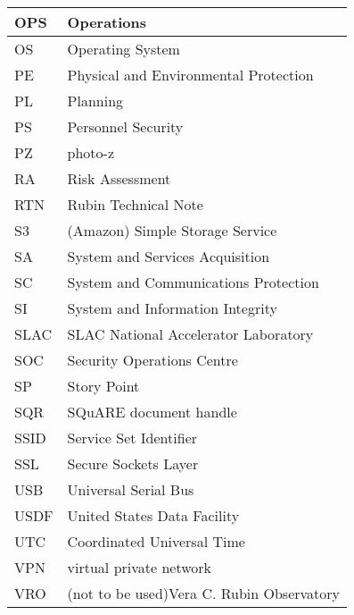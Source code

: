 \begin{longtable}{p{}p{}}
OPS & Operations \\\hline
OS & Operating System \\\hline
PE & Physical and Environmental Protection \\\hline
PL & Planning \\\hline
PS & Personnel Security \\\hline
PZ & photo-z \\\hline
RA & Risk Assessment \\\hline
RTN & Rubin Technical Note \\\hline
S3 & (Amazon) Simple Storage Service \\\hline
SA & System and Services Acquisition \\\hline
SC & System and Communications Protection \\\hline
SI & System and Information Integrity \\\hline
SLAC & SLAC National Accelerator Laboratory \\\hline
SOC & Security Operations Centre \\\hline
SP & Story Point \\\hline
SQR & SQuARE document handle \\\hline
SSID & Service Set Identifier \\\hline
SSL & Secure Sockets Layer \\\hline
USB & Universal Serial Bus \\\hline
USDF & United States Data Facility \\\hline
UTC & Coordinated Universal Time \\\hline
VPN & virtual private network \\\hline
VRO & (not to be used)Vera C. Rubin Observatory \\\hline
\end{longtable}
